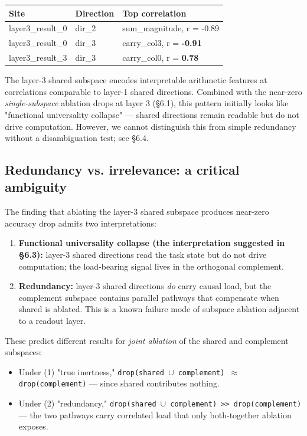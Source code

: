 \begin{center}
\begin{tabular}{|l|l|l|}
\hline
\textbf{Site} & \textbf{Direction} & \textbf{Top correlation} \\
\hline
layer3\_result\_0 & dir\_2 & sum\_magnitude, r = -0.89 \\
layer3\_result\_0 & dir\_3 & carry\_col3, r = \textbf{-0.91} \\
layer3\_result\_3 & dir\_3 & carry\_col0, r = \textbf{0.78} \\
\hline
\end{tabular}
\end{center}


The layer-3 shared subspace encodes interpretable arithmetic features at
correlations comparable to layer-1 shared directions. Combined with the
near-zero \emph{single-subspace} ablation drops at layer 3 (\S{}6.1), this
pattern initially looks like "functional universality collapse" --- shared
directions remain readable but do not drive computation. However, we
cannot distinguish this from simple redundancy without a disambiguation
test; see \S{}6.4.

\subsection{Redundancy vs. irrelevance: a critical ambiguity}

The finding that ablating the layer-3 shared subspace produces near-zero
accuracy drop admits two interpretations:

\begin{enumerate}
  \item \textbf{Functional universality collapse (the interpretation suggested in \S{}6.3):} layer-3 shared directions read the task state but do not drive computation; the load-bearing signal lives in the orthogonal complement.
  \item \textbf{Redundancy:} layer-3 shared directions \emph{do} carry causal load, but the complement subspace contains parallel pathways that compensate when shared is ablated. This is a known failure mode of subspace ablation adjacent to a readout layer.
\end{enumerate}

These predict different results for \emph{joint ablation} of the shared and
complement subspaces:

\begin{itemize}
  \item Under (1) "true inertness," \texttt{drop(shared $\cup$ complement) $\approx$ drop(complement)} --- since shared contributes nothing.
  \item Under (2) "redundancy," \texttt{drop(shared $\cup$ complement) >> drop(complement)} --- the two pathways carry correlated load that only both-together ablation exposes.
\end{itemize}

